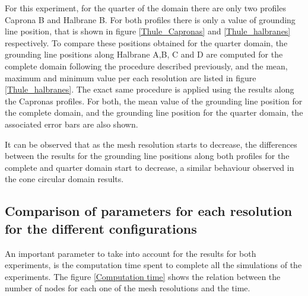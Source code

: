 \documentclass{article}
\begin{document}
For this experiment, for the quarter of the domain there are only two profiles Caprona B and Halbrane B. For both profiles there is only a value of grounding line position, that is shown in figure \ref{Thule_Capronas} and \ref{Thule_halbranes} respectively. To compare these positions obtained for the quarter domain, the grounding line positions along Halbrane A,B, C and D are computed for the complete domain following the procedure described previously, and the mean, maximum and minimum value per each resolution are listed in figure \ref{Thule_halbranes}. The exact same procedure is applied using the results along the Capronas profiles. For both, the mean value of the grounding line position for the complete domain, and the grounding line position for the quarter domain, the associated error bars are also shown.

It can be observed that as the mesh resolution starts to decrease, the differences between the results for the grounding line positions along both profiles for the complete and quarter domain start to decrease, a similar behaviour observed in the cone circular domain results. 

\subsection{Comparison of parameters for each resolution for the different configurations}

An important parameter to take into account for the results for both experiments, is the computation time spent to complete all the simulations of the experiments. The figure \ref{Computation time} shows the relation between the number of nodes for each one of the mesh resolutions and the time.
\end{document}
